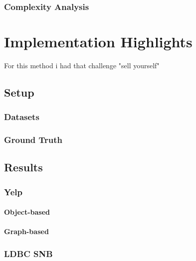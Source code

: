 \subsubsection{Complexity Analysis}

\section{Implementation Highlights}
For this method i had that challenge "sell yourself"
 
 
 
 \subsection{Setup}
 \subsubsection{Datasets}
 \subsubsection{Ground Truth}
   
  \subsection{Results}
    \subsubsection{Yelp}
        \paragraph{Object-based}
        \paragraph{Graph-based}
        
    \subsubsection{LDBC SNB}